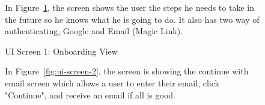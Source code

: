 \begin{figure}[!h]
\begin{minipage}{0.3\textwidth}
        \caption{UI Screen 1: Onboarding View}
        \label{fig:ui-screen-1}
    \end{minipage}
    \hfill
    \begin{minipage}{0.65\textwidth}
        In Figure~\ref{fig:ui-screen-1}, the screen shows the user the steps he needs to take in the future so he knows what he is going to do. It also has two way of authenticating, Google and Email (Magic Link).
    \end{minipage}
\end{figure}

\begin{figure}[!h]
    \begin{minipage}{0.65\textwidth}
        In Figure~\ref{fig:ui-screen-2}, the screen is showing the continue with email screen which allows a user to enter their email, click "Continue", and receive an email if all is good.
    \end{minipage}
    \hfill
    \begin{minipage}{0.3\textwidth}
        \centering

\end{minipage}
\end{figure}
